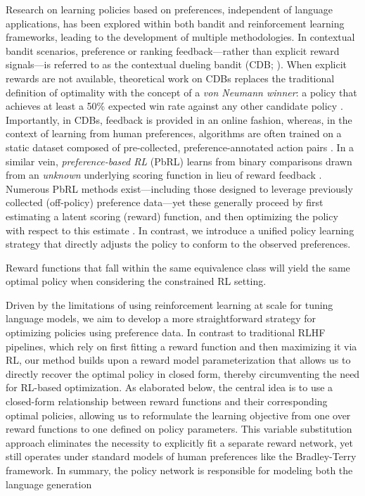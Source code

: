 Research on learning policies based on preferences, independent of language applications, has been explored within both bandit and reinforcement learning frameworks, leading to the development of multiple methodologies. In contextual bandit scenarios, preference or ranking feedback—rather than explicit reward signals—is referred to as the contextual dueling bandit (CDB; \cite{yue2012karmed,dudik2015contextual}). When explicit rewards are not available, theoretical work on CDBs replaces the traditional definition of optimality with the concept of a \textit{von Neumann winner}: a policy that achieves at least a 50\% expected win rate against any other candidate policy \citep{dudik2015contextual}. Importantly, in CDBs, feedback is provided in an online fashion, whereas, in the context of learning from human preferences, algorithms are often trained on a static dataset composed of pre-collected, preference-annotated action pairs \citep{yan2022human}. In a similar vein, \textit{preference-based RL} (PbRL) learns from binary comparisons drawn from an \textit{unknown} underlying scoring function in lieu of reward feedback \citep{BusaFekete2014,ruiz2023dueling}. Numerous PbRL methods exist—including those designed to leverage previously collected (off-policy) preference data—yet these generally proceed by first estimating a latent scoring (reward) function, and then optimizing the policy with respect to this estimate \citep{jain2013learning,BusaFekete2014,christiano2017deep,sadigh2017active,kupcsik2018learning}. In contrast, we introduce a unified policy learning strategy that directly adjusts the policy to conform to the observed preferences.

\begin{lemma}\label{lemma:same_policy}
Reward functions that fall within the same equivalence class will yield the same optimal policy when considering the constrained RL setting.
\end{lemma}

Driven by the limitations of using reinforcement learning at scale for tuning language models, we aim to develop a more straightforward strategy for optimizing policies using preference data. In contrast to traditional RLHF pipelines, which rely on first fitting a reward function and then maximizing it via RL, our method builds upon a reward model parameterization that allows us to directly recover the optimal policy in closed form, thereby circumventing the need for RL-based optimization. As elaborated below, the central idea is to use a closed-form relationship between reward functions and their corresponding optimal policies, allowing us to reformulate the learning objective from one over reward functions to one defined on policy parameters. This variable substitution approach eliminates the necessity to explicitly fit a separate reward network, yet still operates under standard models of human preferences like the Bradley-Terry framework. In summary, the policy network is responsible for modeling both the language generation

